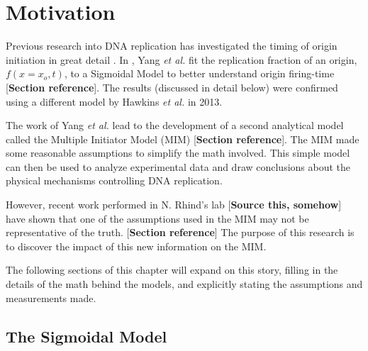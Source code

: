 \chapter{Motivation}
\label{ch:Motivation}

Previous research into DNA replication has investigated the timing of origin initiation in great detail \cite{ScottsPaper,StochasticTermination}.
In \cite{ScottsPaper}, Yang \emph{et al.} fit the replication fraction of an origin, $f(x=x_o,t)$, to a Sigmoidal Model to better understand origin firing-time [\textbf{Section reference}].
The results (discussed in detail below) were confirmed using a different model by Hawkins \emph{et al.} \cite{StochasticTermination} in 2013.

The work of Yang \emph{et al.} lead to the development of a second analytical model called the Multiple Initiator Model (MIM) [\textbf{Section reference}].
The MIM made some reasonable assumptions to simplify the math involved.
This simple model can then be used to analyze experimental data and draw conclusions about the physical mechanisms controlling DNA replication.

However, recent work performed in N. Rhind's lab [\textbf{Source this, somehow}] have shown that one of the assumptions used in the MIM may not be representative of the truth. [\textbf{Section reference}]
The purpose of this research is to discover the impact of this new information on the MIM.

The following sections of this chapter will expand on this story, filling in the details of the math behind the models, and explicitly stating the assumptions and measurements made.


	\section{The Sigmoidal Model}
	\label{sec:SigmoidalModel}
	
	